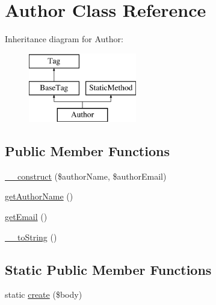\hypertarget{classphp_documentor_1_1_reflection_1_1_doc_block_1_1_tags_1_1_author}{}\section{Author Class Reference}
\label{classphp_documentor_1_1_reflection_1_1_doc_block_1_1_tags_1_1_author}
Inheritance diagram for Author\+:\begin{figure}[H]
\begin{center}
\leavevmode
\includegraphics[height=3.000000cm]{classphp_documentor_1_1_reflection_1_1_doc_block_1_1_tags_1_1_author}
\end{center}
\end{figure}
\subsection*{Public Member Functions}
\begin{DoxyCompactItemize}
\item 
\mbox{\hyperlink{classphp_documentor_1_1_reflection_1_1_doc_block_1_1_tags_1_1_author_a8286b91483c14fabb3ee222bef511e0f}{\+\_\+\+\_\+construct}} (\$author\+Name, \$author\+Email)
\item 
\mbox{\hyperlink{classphp_documentor_1_1_reflection_1_1_doc_block_1_1_tags_1_1_author_a8c951178b5a53b3a80694aa6b71013b0}{get\+Author\+Name}} ()
\item 
\mbox{\hyperlink{classphp_documentor_1_1_reflection_1_1_doc_block_1_1_tags_1_1_author_a02a01849f28e2535e888ae4ec87b20f2}{get\+Email}} ()
\item 
\mbox{\hyperlink{classphp_documentor_1_1_reflection_1_1_doc_block_1_1_tags_1_1_author_a7516ca30af0db3cdbf9a7739b48ce91d}{\+\_\+\+\_\+to\+String}} ()
\end{DoxyCompactItemize}
\subsection*{Static Public Member Functions}
\begin{DoxyCompactItemize}
\item 
static \mbox{\hyperlink{classphp_documentor_1_1_reflection_1_1_doc_block_1_1_tags_1_1_author_a322bfa4cad4fbe7364f4ab65c8f8588c}{create}} (\$body)
\end{DoxyCompactItemize}
